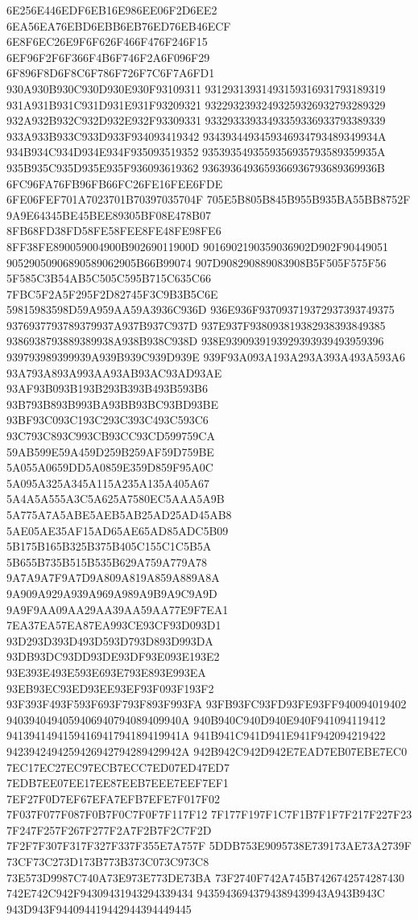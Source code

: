 6E256E446EDF6EB16E986EE06F2D6EE2
6EA56EA76EBD6EBB6EB76ED76EB46ECF
6E8F6EC26E9F6F626F466F476F246F15
6EF96F2F6F366F4B6F746F2A6F096F29
6F896F8D6F8C6F786F726F7C6F7A6FD1
930A930B930C930D930E930F93109311
93129313931493159316931793189319
931A931B931C931D931E931F93209321
93229323932493259326932793289329
932A932B932C932D932E932F93309331
93329333933493359336933793389339
933A933B933C933D933F934093419342
9343934493459346934793489349934A
934B934C934D934E934F935093519352
9353935493559356935793589359935A
935B935C935D935E935F936093619362
9363936493659366936793689369936B
6FC96FA76FB96FB66FC26FE16FEE6FDE
6FE06FEF701A7023701B70397035704F
705E5B805B845B955B935BA55BB8752F
9A9E64345BE45BEE89305BF08E478B07
8FB68FD38FD58FE58FEE8FE48FE98FE6
8FF38FE890059004900B90269011900D
9016902190359036902D902F90449051
90529050906890589062905B66B99074
907D908290889083908B5F505F575F56
5F585C3B54AB5C505C595B715C635C66
7FBC5F2A5F295F2D82745F3C9B3B5C6E
59815983598D59A959AA59A3936C936D
936E936F937093719372937393749375
9376937793789379937A937B937C937D
937E937F938093819382938393849385
9386938793889389938A938B938C938D
938E9390939193929393939493959396
939793989399939A939B939C939D939E
939F93A093A193A293A393A493A593A6
93A793A893A993AA93AB93AC93AD93AE
93AF93B093B193B293B393B493B593B6
93B793B893B993BA93BB93BC93BD93BE
93BF93C093C193C293C393C493C593C6
93C793C893C993CB93CC93CD599759CA
59AB599E59A459D259B259AF59D759BE
5A055A0659DD5A0859E359D859F95A0C
5A095A325A345A115A235A135A405A67
5A4A5A555A3C5A625A7580EC5AAA5A9B
5A775A7A5ABE5AEB5AB25AD25AD45AB8
5AE05AE35AF15AD65AE65AD85ADC5B09
5B175B165B325B375B405C155C1C5B5A
5B655B735B515B535B629A759A779A78
9A7A9A7F9A7D9A809A819A859A889A8A
9A909A929A939A969A989A9B9A9C9A9D
9A9F9AA09AA29AA39AA59AA77E9F7EA1
7EA37EA57EA87EA993CE93CF93D093D1
93D293D393D493D593D793D893D993DA
93DB93DC93DD93DE93DF93E093E193E2
93E393E493E593E693E793E893E993EA
93EB93EC93ED93EE93EF93F093F193F2
93F393F493F593F693F793F893F993FA
93FB93FC93FD93FE93FF940094019402
9403940494059406940794089409940A
940B940C940D940E940F941094119412
9413941494159416941794189419941A
941B941C941D941E941F942094219422
9423942494259426942794289429942A
942B942C942D942E7EAD7EB07EBE7EC0
7EC17EC27EC97ECB7ECC7ED07ED47ED7
7EDB7EE07EE17EE87EEB7EEE7EEF7EF1
7EF27F0D7EF67EFA7EFB7EFE7F017F02
7F037F077F087F0B7F0C7F0F7F117F12
7F177F197F1C7F1B7F1F7F217F227F23
7F247F257F267F277F2A7F2B7F2C7F2D
7F2F7F307F317F327F337F355E7A757F
5DDB753E9095738E739173AE73A2739F
73CF73C273D173B773B373C073C973C8
73E573D9987C740A73E973E773DE73BA
73F2740F742A745B7426742574287430
742E742C942F94309431943294339434
94359436943794389439943A943B943C
943D943F944094419442944394449445

